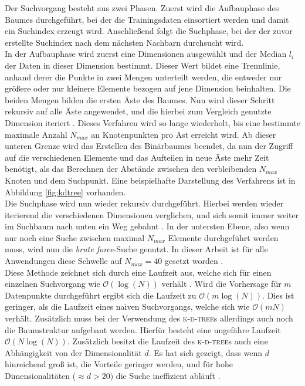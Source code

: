 
Der Suchvorgang besteht aus zwei Phasen. Zuerst wird die Aufbauphase des Baumes durchgeführt, bei der die Trainingsdaten einsortiert werden und damit ein Suchindex erzeugt wird. Anschließend folgt die Suchphase, bei der der zuvor erstellte Suchindex nach dem nächsten Nachbarn durchsucht wird.\\

In der Aufbauphase wird zuerst eine Dimensionen ausgewählt und der Median $l_i$ der Daten in dieser Dimension bestimmt. Dieser Wert bildet eine Trennlinie, anhand derer die Punkte in zwei Mengen unterteilt werden, die entweder nur größere oder nur kleinere Elemente bezogen auf jene Dimension beinhalten. Die beiden Mengen bilden die ersten Äste des Baumes. Nun wird dieser Schritt rekursiv auf alle Äste angewendet, und die hierbei zum Vergleich genutzte Dimension iteriert \cite{de2000computational}. Dieses Verfahren wird so lange wiederholt, bis eine bestimmte maximale Anzahl $N_{max}$ an Knotenpunkten pro Ast erreicht wird. Ab dieser unteren Grenze wird das Erstellen des Binärbaumes beendet, da nun der Zugriff auf die verschiedenen Elemente und das Aufteilen in neue Äste mehr Zeit benötigt, als das Berechnen der Abstände zwischen den verbleibenden $N_{max}$ Knoten und dem Suchpunkt. Eine beispielhafte Darstellung des Verfahrens ist in Abbildung \ref{fig:kdtree} vorhanden.\\

Die Suchphase wird nun wieder rekursiv durchgeführt. Hierbei werden wieder iterierend die verschiedenen Dimensionen verglichen, und sich somit immer weiter im Suchbaum nach unten ein Weg gebahnt \cite{de2000computational}. In der untersten Ebene, also wenn nur noch eine Suche zwischen maximal $N_{max}$ Elemente durchgeführt werden muss, wird nun die \textit{brute force}-Suche genutzt. In dieser Arbeit ist für alle Anwendungen diese Schwelle auf $N_{max} = 40$ gesetzt worden \citep{scikitlearnneighbours}.\\

Diese Methode zeichnet sich durch eine Laufzeit aus, welche sich für einen einzelnen Suchvorgang wie $\mathcal{O}(\log(N))$ verhält \cite{bentley1975multidimensional}. Wird die Vorhersage für $m$ Datenpunkte durchgeführt ergibt sich die Laufzeit zu $\mathcal{O}(m\log(N))$. Dies ist geringer, als die Laufzeit eines naiven Suchvorgangs, welche sich wie $\mathcal{O}(mN)$ verhält. Zusätzlich muss bei der Verwendung des \textsc{k-d-tree}s allerdings auch noch die Baumstruktur aufgebaut werden. Hierfür besteht eine ungefähre Laufzeit $\mathcal{O}(N \log(N))$. Zusätzlich besitzt die Laufzeit des \textsc{k-d-tree}s auch eine Abhängigkeit von der Dimensionalität $d$. Es hat sich gezeigt, dass wenn $d$ hinreichend groß ist, die Vorteile geringer werden, und für hohe Dimensionalitäten ($\approx d > 20)$ die Suche ineffizient abläuft \citep{scikitlearnneighbours}.\\

